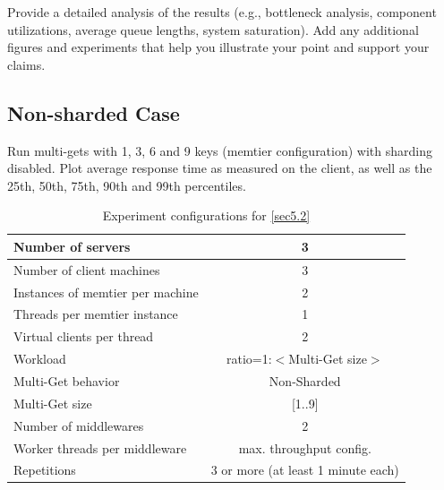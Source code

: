 \documentclass[11pt,a4paper]{article}
\begin{document}
Provide a detailed analysis of the results (e.g., bottleneck analysis, component utilizations, average queue lengths, system saturation). Add any additional figures and experiments that help you illustrate your point and support your claims.

\subsection{Non-sharded Case} \label{sec5.2}

Run multi-gets with 1, 3, 6 and 9 keys (memtier configuration) with sharding disabled. Plot average response time as measured on the client, as well as the 25th, 50th, 75th, 90th and 99th percentiles.

\begin{center}
    \begin{table}
        \centering
    	\begin{tabular}{|l|c|}
    		\hline Number of servers                & 3                       \\ 
    		\hline Number of client machines        & 3                       \\ 
    		\hline Instances of memtier per machine & 2                       \\ 
    		\hline Threads per memtier instance     & 1                       \\
    		\hline Virtual clients per thread       & 2                		 \\ 
    		\hline Workload                         & ratio=1:$<$Multi-Get size$>$              \\
    		\hline Multi-Get behavior               & Non-Sharded             \\
    		\hline Multi-Get size                   & [1..9]                  \\
    		\hline Number of middlewares            & 2                       \\
    		\hline Worker threads per middleware    & max. throughput config. \\
    		\hline Repetitions                      & 3 or more (at least 1 minute each)               \\ 
    		\hline 
    	\end{tabular}
    	\caption{Experiment configurations for \autoref{sec5.2}} \label{exp5-2}
    \end{table}
\end{center}
\end{document}
